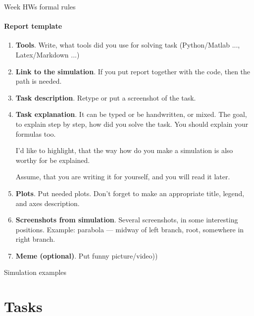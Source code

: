 \documentclass[aspectratio=169]{beamer}
\begin{document}
    \begin{frame}[t]{Week HWs formal rules}
    \framesubtitle{Report template}
        \begin{enumerate}
            \footnotesize
            \item \textbf{Tools}. Write, what tools did you use for solving task (Python/Matlab ..., Latex/Markdown ...)
            \item \textbf{Link to the simulation}. If you put report together with the code, then the path is needed.
            \item \textbf{Task description}. Retype or put a screenshot of the task.
            \item \textbf{Task explanation}. It can be typed or be handwritten, or mixed. The goal, to explain step by step, how did you solve the task. You should explain your formulas too.

            I'd like to highlight, that the way how do you make a simulation is also worthy for be explained.

            Assume, that you are writing it for yourself, and you will read it later.
            \item \textbf{Plots}. Put needed plots. Don't forget to make an appropriate title, legend, and axes description.
            \item \textbf{Screenshots from simulation}. Several screenshots, in some interesting positions. Example: parabola --- midway of left branch, root, somewhere in right branch.
            \item \textbf{Meme (optional)}. Put funny picture/video))
        \end{enumerate}
    \end{frame}

    \begin{frame}[t]{Simulation examples}
    \framesubtitle{}
        
    \end{frame}

    \section*{Tasks}
\end{document}
